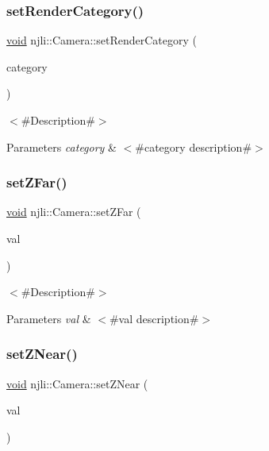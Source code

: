 \subsubsection{\texorpdfstring{set\+Render\+Category()}{setRenderCategory()}}
{\footnotesize\ttfamily \mbox{\hyperlink{_thread_8h_af1e856da2e658414cb2456cb6f7ebc66}{void}} njli\+::\+Camera\+::set\+Render\+Category (\begin{DoxyParamCaption}\item[{const \mbox{\hyperlink{namespacenjli_af7b302a2b48bb644f85c88080925c974}{njli\+Bit\+Categories}}}]{category }\end{DoxyParamCaption})}

$<$\#\+Description\#$>$


\begin{DoxyParams}{Parameters}
{\em category} & $<$\#category description\#$>$ \\
\hline
\end{DoxyParams}
\mbox{\label{classnjli_1_1_camera_a078a786623bfed82e5c42af635ff7c50}} 
\subsubsection{\texorpdfstring{set\+Z\+Far()}{setZFar()}}
{\footnotesize\ttfamily \mbox{\hyperlink{_thread_8h_af1e856da2e658414cb2456cb6f7ebc66}{void}} njli\+::\+Camera\+::set\+Z\+Far (\begin{DoxyParamCaption}\item[{const \mbox{\hyperlink{_util_8h_a5f6906312a689f27d70e9d086649d3fd}{f32}}}]{val }\end{DoxyParamCaption})}

$<$\#\+Description\#$>$


\begin{DoxyParams}{Parameters}
{\em val} & $<$\#val description\#$>$ \\
\hline
\end{DoxyParams}
\mbox{\label{classnjli_1_1_camera_aecd11caf4880997cdaecef6c47d69c48}} 
\subsubsection{\texorpdfstring{set\+Z\+Near()}{setZNear()}}
{\footnotesize\ttfamily \mbox{\hyperlink{_thread_8h_af1e856da2e658414cb2456cb6f7ebc66}{void}} njli\+::\+Camera\+::set\+Z\+Near (\begin{DoxyParamCaption}\item[{const \mbox{\hyperlink{_util_8h_a5f6906312a689f27d70e9d086649d3fd}{f32}}}]{val }\end{DoxyParamCaption})}

